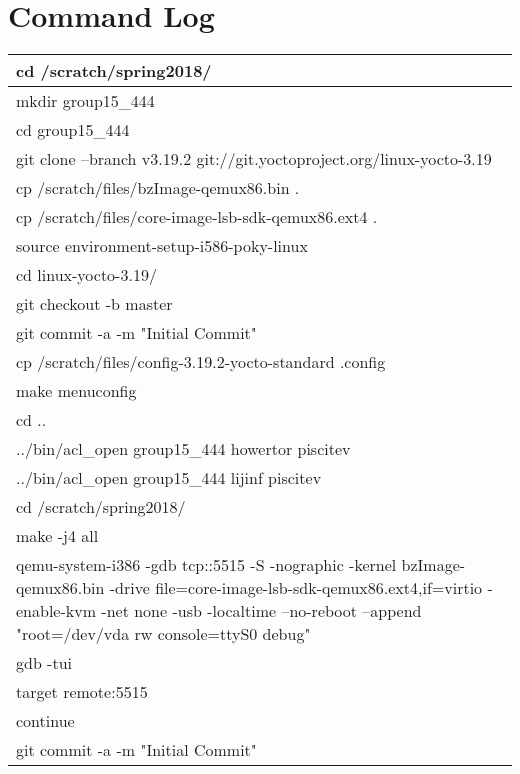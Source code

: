 \documentclass[10pt,draftclsnofoot,onecolumn]{IEEEtran}
\begin{document}
    \section{Command Log}
    \begin{center}
        \begin{tabular}{ | p{14cm} | }
        \hline
        cd /scratch/spring2018/ \\ \hline
        mkdir group15\_444 \\ \hline
        cd group15\_444 \\ \hline
        git clone --branch v3.19.2 git://git.yoctoproject.org/linux-yocto-3.19  \\ \hline
        cp /scratch/files/bzImage-qemux86.bin . \\ \hline
        cp /scratch/files/core-image-lsb-sdk-qemux86.ext4 . \\ \hline
        source environment-setup-i586-poky-linux \\ \hline
        cd linux-yocto-3.19/  \\ \hline
        git checkout -b master \\ \hline
        git commit -a -m "Initial Commit"  \\ \hline 
        cp /scratch/files/config-3.19.2-yocto-standard .config \\ \hline
        make menuconfig  \\ \hline
        cd .. \\ \hline
        ../bin/acl\_open group15\_444 howertor piscitev \\ \hline
        ../bin/acl\_open group15\_444 lijinf piscitev \\ \hline
		cd /scratch/spring2018/ \\ \hline
		make -j4 all \\ \hline
		qemu-system-i386 -gdb tcp::5515 -S -nographic -kernel bzImage-qemux86.bin -drive file=core-image-lsb-sdk-qemux86.ext4,if=virtio -enable-kvm -net none -usb -localtime --no-reboot --append "root=/dev/vda rw console=ttyS0 debug" \\ \hline
        gdb -tui \\ \hline
        target remote:5515 \\ \hline
        continue \\ \hline
        git commit -a -m "Initial Commit"  \\ \hline
		\end{tabular}
    \end{center}
    
\end{document}
